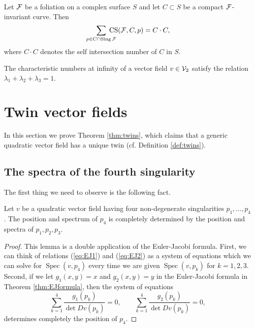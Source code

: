 \documentclass[phd,tocprelim]{cornell}
\begin{document}
\begin{theorem}
 Let $\mathcal{F}$ be a foliation on a complex surface $S$ and let $C\subset S$ be a compact $\mathcal{F}$-invariant curve. Then
  \[ \sum_{p\in C\cap\operatorname{Sing}\F}\hspace{-12pt}\CSindex{\F}{C}{p} = C\cdot C, \]
 where $C\cdot C$ denotes the self intersection number of $C$ in $S$.
\end{theorem}

\begin{corollary}
  The characteristic numbers at infinity of a vector field $v\in\mathcal{V}_2$ satisfy the relation $\lambda_1+\lambda_2+\lambda_3 = 1$.
\end{corollary}




\section{Twin vector fields}

In this section we prove Theorem \ref{thm:twins}, which claims that a generic quadratic vector field has a unique twin (cf. Definition \ref{def:twins}).

\subsection{The spectra of the fourth singularity}

The first thing we need to observe is the following fact.

\begin{lemma}\label{lemma:3outOf4}
Let $v$ be a quadratic vector field having four non-degenerate singularities $p_1,\ldots,p_4$. The position and spectrum of $p_4$ is completely determined by the position and spectra of $p_1,p_2,p_3$.
\end{lemma}

\begin{proof}
This lemma is a double application of the Euler-Jacobi formula. First, we can think of relations (\ref{eq:EJ1}) and (\ref{eq:EJ2}) as a system of equations which we can solve for $\operatorname{Spec}(v,p_4)$ every time we are given $\operatorname{Spec}(v,p_k)$ for $k=1,2,3$. Second, if we let $g_1(x,y)=x$ and $g_2(x,y)=y$ in the Euler-Jacobi formula in Theorem \ref{thm:EJformula}, then the system of equations 
\[ \sum_{k=1}^4 \frac{g_1(p_k)}{\det{Dv(p_k)}}=0,\qquad \sum_{k=1}^4 \frac{g_2(p_k)}{\det{Dv(p_k)}}=0, \]
determines completely the position of $p_4$.
\end{proof}
\end{document}
